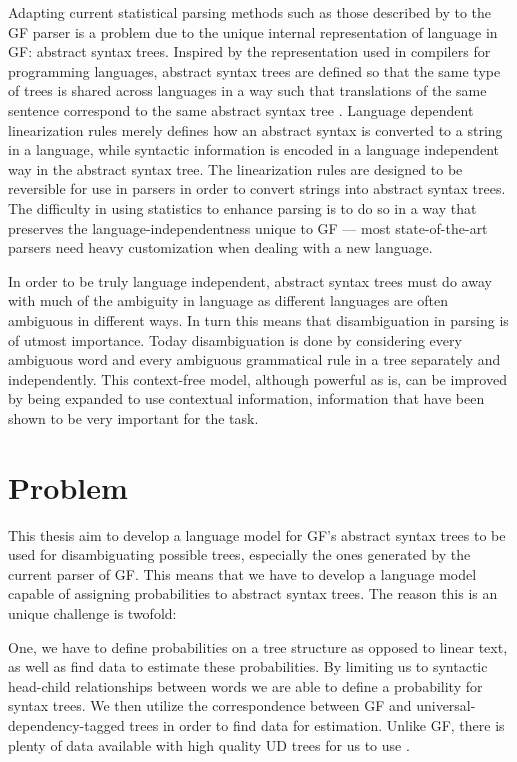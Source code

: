 Adapting current statistical parsing methods such as those described by \citet[Chapter 14]{jurafsky2009speech} to the GF parser is a problem due to the unique internal representation of language in GF: abstract syntax trees. Inspired by the representation used in compilers for programming languages, abstract syntax trees are defined so that the same type of trees is shared across languages in a way such that translations of the same sentence correspond to the same abstract syntax tree \citep{kolachina2016gf2ud}. Language dependent linearization rules merely defines how an abstract syntax is converted to a string in a language, while syntactic information is encoded in a language independent way in the abstract syntax tree. The linearization rules are designed to be reversible for use in parsers in order to convert strings into abstract syntax trees. The difficulty in using statistics to enhance parsing is to do so in a way that preserves the language-independentness unique to GF --- most state-of-the-art parsers need heavy customization when dealing with a new language.

In order to be truly language independent, abstract syntax trees must do away with much of the ambiguity in language as different languages are often ambiguous in different ways. In turn this means that disambiguation in parsing is of utmost importance. Today disambiguation is done by considering every ambiguous word and every ambiguous grammatical rule in a tree separately and independently. This context-free model, although powerful as is, can be improved by being expanded to use contextual information, information that have been shown to be very important for the task.

\section{Problem}

This thesis aim to develop a language model for GF's abstract syntax trees to be used for disambiguating possible trees, especially the ones generated by the current parser of GF. This means that we have to develop a language model capable of assigning probabilities to abstract syntax trees. The reason this is an unique challenge is twofold: 

One, we have to define probabilities on a tree structure as opposed to linear text, as well as find data to estimate these probabilities. By limiting us to syntactic head-child relationships between words we are able to define a probability for syntax trees. We then utilize the correspondence between GF and universal-dependency-tagged trees \citep{kolachina2016gf2ud} in order to find data for estimation. Unlike GF, there is plenty of data available with high quality UD trees for us to use \citep{ginter2017conll}. 


